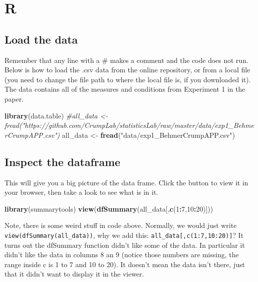 \documentclass[
]{book}
\newenvironment{Shaded}{\begin{snugshade}}{\end{snugshade}}
\newcommand{\CommentTok}[1]{\textcolor[rgb]{0.56,0.35,0.01}{\textit{#1}}}
\newcommand{\DecValTok}[1]{\textcolor[rgb]{0.00,0.00,0.81}{#1}}
\newcommand{\FunctionTok}[1]{\textcolor[rgb]{0.13,0.29,0.53}{\textbf{#1}}}
\newcommand{\NormalTok}[1]{#1}
\newcommand{\OtherTok}[1]{\textcolor[rgb]{0.56,0.35,0.01}{#1}}
\newcommand{\SpecialCharTok}[1]{\textcolor[rgb]{0.81,0.36,0.00}{\textbf{#1}}}
\newcommand{\StringTok}[1]{\textcolor[rgb]{0.31,0.60,0.02}{#1}}
\begin{document}
\hypertarget{r-9}{%
\section{R}\label{r-9}}

\hypertarget{load-the-data-3}{%
\subsection{Load the data}\label{load-the-data-3}}

Remember that any line with a \# makes a comment and the code does not run. Below is how to load the .csv data from the online repository, or from a local file (you need to change the file path to where the local file is, if you downloaded it). The data contains all of the measures and conditions from Experiment 1 in the paper.

\begin{Shaded}
\begin{Highlighting}[]
\FunctionTok{library}\NormalTok{(data.table)}
\CommentTok{\#all\_data \textless{}{-} fread("https://github.com/CrumpLab/statisticsLab/raw/master/data/exp1\_BehmerCrumpAPP.csv")}
\NormalTok{all\_data }\OtherTok{\textless{}{-}} \FunctionTok{fread}\NormalTok{(}\StringTok{"data/exp1\_BehmerCrumpAPP.csv"}\NormalTok{)}
\end{Highlighting}
\end{Shaded}

\hypertarget{inspect-the-dataframe-1}{%
\subsection{Inspect the dataframe}\label{inspect-the-dataframe-1}}

This will give you a big picture of the data frame. Click the button to view it in your browser, then take a look to see what is in it.

\begin{Shaded}
\begin{Highlighting}[]
\FunctionTok{library}\NormalTok{(summarytools)}
\FunctionTok{view}\NormalTok{(}\FunctionTok{dfSummary}\NormalTok{(all\_data[,}\FunctionTok{c}\NormalTok{(}\DecValTok{1}\SpecialCharTok{:}\DecValTok{7}\NormalTok{,}\DecValTok{10}\SpecialCharTok{:}\DecValTok{20}\NormalTok{)]))}
\end{Highlighting}
\end{Shaded}

Note, there is some weird stuff in code above. Normally, we would just write \texttt{view(dfSummary(all\_data))}, why we add this: \texttt{all\_data{[},c(1:7,10:20){]}}? It turns out the dfSummary function didn't like some of the data. In particular it didn't like the data in columns 8 an 9 (notice those numbers are missing, the range inside c is 1 to 7 and 10 to 20). It doesn't mean the data isn't there, just that it didn't want to display it in the viewer.
\end{document}
